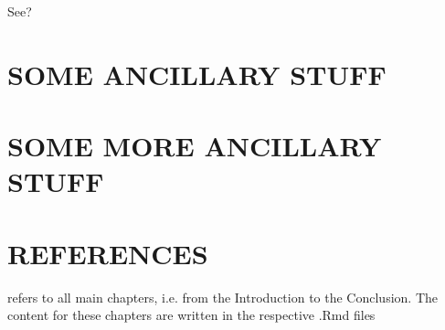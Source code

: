 \documentclass[12pt,econ]{sources/authesis}
\def\ssp{\def\baselinestretch{1.0}\large\normalsize}
\theoremstyle{definition}
\theoremstyle{definition}
\theoremstyle{definition}
\theoremstyle{remark}
\begin{document}
See?

\appendix

\chapter{SOME ANCILLARY STUFF}\label{some-ancillary-stuff}

\chapter{SOME MORE ANCILLARY STUFF}\label{some-more-ancillary-stuff}

\chapter*{REFERENCES}\label{references}

\noindent

\ssp refers to all main chapters, i.e. from the Introduction to the Conclusion. The content for these chapters are written in the respective .Rmd files
\end{document}
